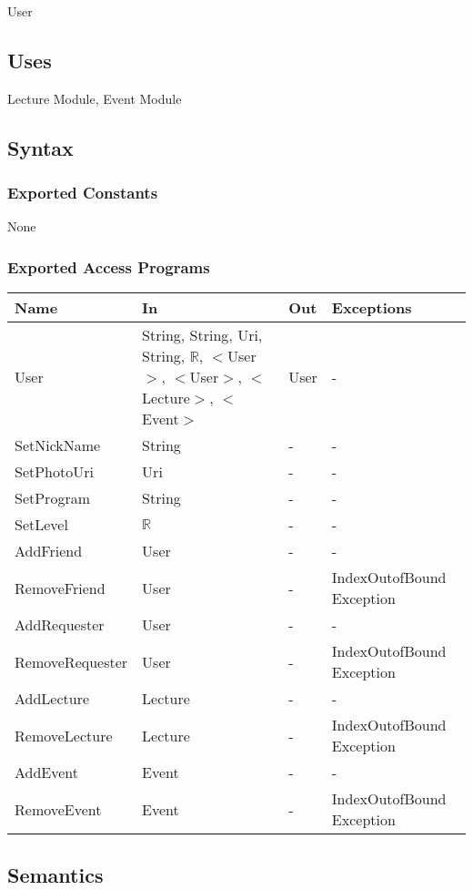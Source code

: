 \documentclass[12pt, titlepage]{article}
\begin{document}
User

\subsection{Uses}

Lecture Module, Event Module

\subsection{Syntax}

\subsubsection{Exported Constants}
None

\subsubsection{Exported Access Programs}
\begin{center}
\begin{tabular}{p{4cm} p{2cm} p{4cm} p{4cm}}
\hline
\textbf{Name} & \textbf{In} & \textbf{Out} & \textbf{Exceptions} \\
\hline
User & String, String, Uri, String, $\mathbb{R}$, $<$User$>$, $<$User$>$, $<$Lecture$>$, $<$Event$>$ & User & -\\
SetNickName & String & - & -\\
SetPhotoUri & Uri & - & -\\
SetProgram & String & - & -\\
SetLevel & $\mathbb{R}$ & - & -\\
AddFriend & User & - & -\\
RemoveFriend & User & - & IndexOutofBound Exception\\
AddRequester & User & - & -\\
RemoveRequester & User & - & IndexOutofBound Exception\\
AddLecture & Lecture & - & -\\
RemoveLecture & Lecture & - & IndexOutofBound Exception\\
AddEvent & Event & - & -\\
RemoveEvent & Event & - & IndexOutofBound Exception\\
\hline
\end{tabular}
\end{center}

\subsection{Semantics}
\end{document}
